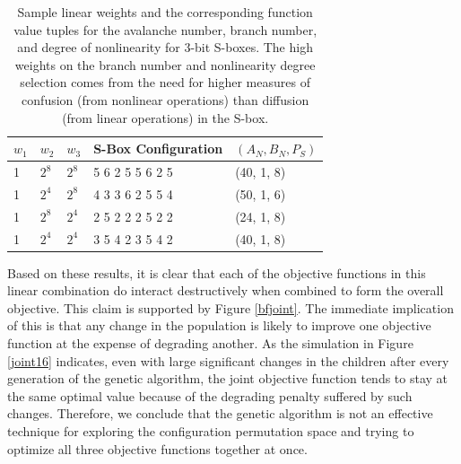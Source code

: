 \documentclass[11pt]{article}
\begin{document}
\begin{table}
	\centering
	\caption{Sample linear weights and the corresponding function value tuples for the avalanche number, branch number, and degree of nonlinearity for $3$-bit S-boxes. The high weights on the branch number and nonlinearity degree selection comes from the need for higher measures of confusion (from nonlinear operations) than diffusion (from linear operations) in the S-box.}
	\label{jointTable}
    \begin{tabular}{|l|l|l|l|l|}
        \hline
        $w_1$ & $w_2$ & $w_3$ & S-Box Configuration & $(A_N, B_N, P_S)$ \\ \hline
        1 & $2^8$ & $2^8$ & 5     6     2     5     5     6     2     5 & (40, 1, 8) \\ 
        1 & $2^4$ & $2^8$ & 4     3     3     6     2     5     5     4 & (50, 1, 6) \\ 
        1 & $2^8$ & $2^4$ & 2     5     2     2     2     5     2     2 & (24, 1, 8) \\ 
        1 & $2^4$ & $2^4$ & 3     5     4     2     3     5     4     2 & (40, 1, 8) \\ 
        \hline
    \end{tabular}
\end{table}

Based on these results, it is clear that each of the objective functions in this linear combination do interact destructively when combined to form the overall objective. This claim is supported by Figure \ref{bfjoint}. The immediate implication of this is that any change in the population is likely to improve one objective function at the expense of degrading another. As the simulation in Figure \ref{joint16} indicates, even with large significant changes in the children after every generation of the genetic algorithm, the joint objective function tends to stay at the same optimal value because of the degrading penalty suffered by such changes. Therefore, we conclude that the genetic algorithm is not an effective technique for exploring the configuration permutation space and trying to optimize all three objective functions together at once. 
\end{document}
